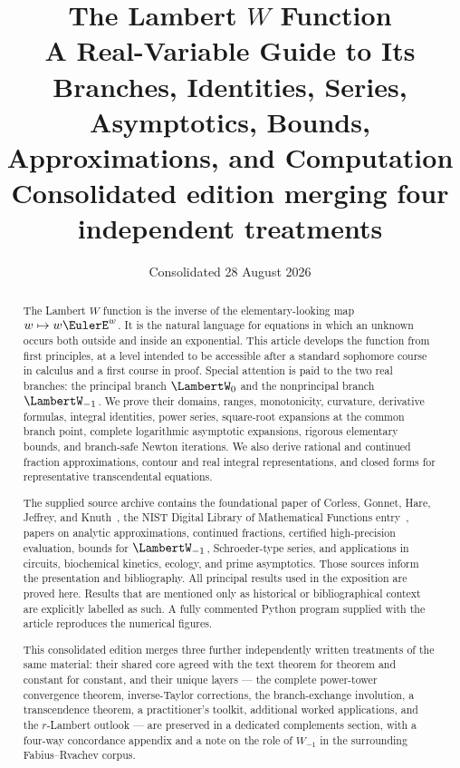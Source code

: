\documentclass[11pt]{article}
\title{\textbf{The Lambert \(W\) Function}\\
\large A Real-Variable Guide to Its Branches, Identities, Series,
Asymptotics, Bounds, Approximations, and Computation\\[0.5em]
\normalsize Consolidated edition merging four independent treatments}
\author{}
\date{Consolidated 28 August 2026}
\theoremstyle{remark}
\newcommand{\Wz}{\LambertW_{0}}
\newcommand{\Wm}{\LambertW_{-1}}
\begin{document}
\maketitle

\begin{abstract}
The Lambert \(W\) function is the inverse of the elementary-looking map
\(w\mapsto w\EulerE^w\).  It is the natural language for equations in which an
unknown occurs both outside and inside an exponential.  This article develops
the function from first principles, at a level intended to be accessible after
a standard sophomore course in calculus and a first course in proof.  Special
attention is paid to the two real branches: the principal branch \(\Wz\) and
the nonprincipal branch \(\Wm\).  We prove their domains, ranges,
monotonicity, curvature, derivative formulas, integral identities, power
series, square-root expansions at the common branch point, complete
logarithmic asymptotic expansions, rigorous elementary bounds, and
branch-safe Newton iterations.  We also derive rational and continued
fraction approximations, contour and real integral representations, and
closed forms for representative transcendental equations.

The supplied source archive contains the foundational paper of Corless,
Gonnet, Hare, Jeffrey, and Knuth~\cite{corless1996}, the NIST Digital Library
of Mathematical Functions entry~\cite{dlmf}, papers on analytic approximations, continued fractions,
certified high-precision evaluation, bounds for \(\Wm\), Schroeder-type
series, and applications in circuits, biochemical kinetics, ecology, and
prime asymptotics.  Those sources inform the presentation and bibliography.
All principal results used in the exposition are proved here.  Results that
are mentioned only as historical or bibliographical context are explicitly
labelled as such.  A fully commented Python program supplied with the article
reproduces the numerical figures.

This consolidated edition merges three further independently written treatments of the same material: their shared core agreed with the text theorem for theorem and constant for constant, and their unique layers --- the complete power-tower convergence theorem, inverse-Taylor corrections, the branch-exchange involution, a transcendence theorem, a practitioner's toolkit, additional worked applications, and the \(r\)-Lambert outlook --- are preserved in a dedicated complements section, with a four-way concordance appendix and a note on the role of \(W_{-1}\) in the surrounding Fabius--Rvachev corpus.
\end{abstract}
\end{document}
